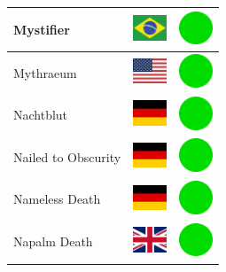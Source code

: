 \documentclass[12pt, a4paper, twoside]{report}
\begin{document}
\begin{center}
\begin{longtable}{|p{5cm}|p{2cm}|p{2cm}|}
 Mystifier                                                  & \includegraphics[width=1cm]{4x3/br} &   \includegraphics[width=1cm]{likes/y} \\ \hline
 Mythraeum                                                  & \includegraphics[width=1cm]{4x3/us} &   \includegraphics[width=1cm]{likes/y} \\ \hline
 Nachtblut                                                  & \includegraphics[width=1cm]{4x3/de} &   \includegraphics[width=1cm]{likes/y} \\ \hline
 Nailed to Obscurity                                        & \includegraphics[width=1cm]{4x3/de} &   \includegraphics[width=1cm]{likes/y} \\ \hline
 Nameless Death                                             & \includegraphics[width=1cm]{4x3/de} &   \includegraphics[width=1cm]{likes/y} \\ \hline
 Napalm Death                                               & \includegraphics[width=1cm]{4x3/gb} &   \includegraphics[width=1cm]{likes/y} \\ \hline

\end{longtable}
\end{center}
\end{document}
